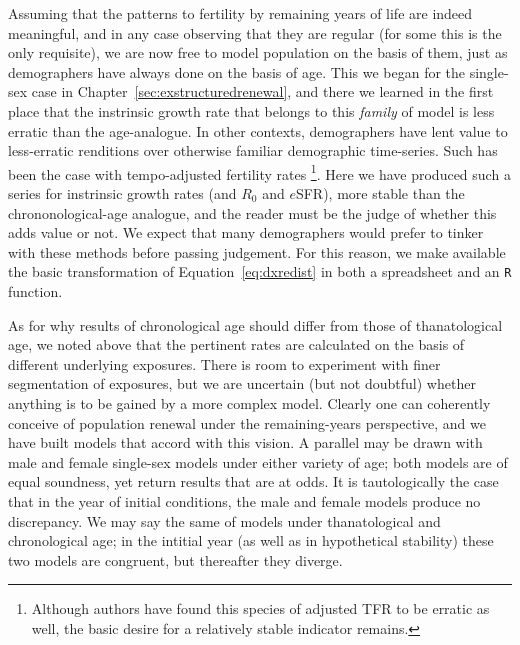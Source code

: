 Assuming that the patterns to fertility by remaining years of life
are indeed meaningful, and in any case observing that they are regular (for
some this is the only requisite), we are now free to model population on the
basis of them, just as demographers have always done on the basis of age. This we began
for the single-sex case in Chapter~\ref{sec:exstructuredrenewal}, and there we
learned in the first place that the instrinsic growth rate that belongs to this
\textit{family} of model is less erratic than the age-analogue. In other
contexts, demographers have lent value to less-erratic renditions over otherwise
familiar demographic time-series. Such has been the case with tempo-adjusted
fertility rates \citep{bongaarts1998quantum}\footnote{Although authors
\citep[e.g.][]{kim2000quantum} have found this species of adjusted TFR to be
erratic as well, the basic desire for a relatively stable indicator remains.}.
Here we have produced such a series for instrinsic growth rates (and $R_0$ and $e$SFR), 
more stable than the chrononological-age analogue, and the reader must be the 
judge of whether this adds value or not. We expect that many demographers would
prefer to tinker with these methods before passing judgement. For this reason,
we make available the basic transformation of Equation~\eqref{eq:dxredist} in both a spreadsheet and
an \texttt{R} function.

As for why results of chronological age should differ from those of
thanatological age, we noted above that the pertinent rates are calculated on
the basis of different underlying exposures. There is room to experiment with
 finer segmentation of exposures, but we are uncertain (but not doubtful)
 whether anything is to be gained by a more complex model. Clearly one can
coherently conceive of population renewal under the remaining-years
perspective, and we have built models that accord with this vision. A parallel
may be drawn with male and female single-sex models under either variety of
age; both models are of equal soundness, yet return results that are at odds. 
It is tautologically the case that in the year of initial conditions, the male and
female models produce no discrepancy. We may say the same of models under
thanatological and chronological age; in the intitial year (as well as in
hypothetical stability) these two models are congruent, but thereafter they
diverge.

